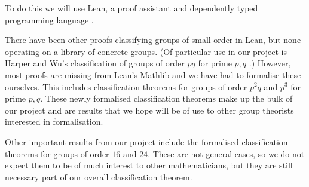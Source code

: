 \documentclass[a4paper,11pt, titlepage]{article}
\theoremstyle{remark}
\begin{document}
To do this we will use Lean, a proof assistant and dependently typed programming language \cite{noauthor_lean_nodate}.

There have been other proofs classifying groups of small order in Lean, but none operating
on a library of concrete groups.
(Of particular use in our project is Harper and Wu's classification of groups of order \(pq\)
for prime \(p, q\) \cite{harper_classifying_2025}.)
However, most proofs are missing from Lean's Mathlib \cite{noauthor_mathlib4_nodate}
and we have had to formalise these ourselves.
This includes classification theorems for groups of order \(p^2q\) and \(p^3\) for prime \(p, q\).
These newly formalised classification theorems make up the bulk of our project and are results
that we hope will be of use to other group theorists interested in formalisation.

Other important results from our project include the formalised classification theorems
for groups of order \(16\) and \(24\).
These are not general cases, so we do not expect them to be of much interest to other mathematicians,
but they are still necessary part of our overall classification theorem. 
\end{document}
